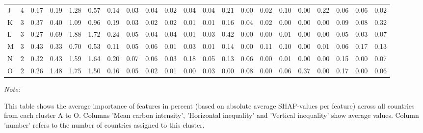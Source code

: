 \begin{table}[H]
{\begin{threeparttable}
\begin{tabular}[t]{lrrrrrrrrrrrrrrrrrrrr}
J & 4 & 0.17 & 0.19 & 1.28 & 0.57 & 0.14 & 0.03 & 0.04 & 0.02 & 0.04 & 0.04 & 0.21 & 0.00 & 0.02 & 0.10 & 0.00 & 0.22 & 0.06 & 0.06 & 0.02\\
K & 3 & 0.37 & 0.40 & 1.09 & 0.96 & 0.19 & 0.03 & 0.02 & 0.02 & 0.01 & 0.01 & 0.16 & 0.04 & 0.02 & 0.00 & 0.00 & 0.00 & 0.09 & 0.08 & 0.32\\
L & 3 & 0.27 & 0.69 & 1.88 & 1.72 & 0.24 & 0.05 & 0.04 & 0.04 & 0.01 & 0.03 & 0.42 & 0.00 & 0.00 & 0.01 & 0.00 & 0.00 & 0.05 & 0.03 & 0.07\\
M & 3 & 0.43 & 0.33 & 0.70 & 0.53 & 0.11 & 0.05 & 0.06 & 0.01 & 0.03 & 0.01 & 0.14 & 0.00 & 0.11 & 0.10 & 0.00 & 0.01 & 0.06 & 0.17 & 0.13\\
N & 2 & 0.32 & 0.43 & 1.59 & 1.64 & 0.20 & 0.07 & 0.06 & 0.03 & 0.18 & 0.05 & 0.13 & 0.06 & 0.00 & 0.01 & 0.00 & 0.00 & 0.15 & 0.00 & 0.07\\
O & 2 & 0.26 & 1.48 & 1.75 & 1.50 & 0.16 & 0.05 & 0.02 & 0.01 & 0.00 & 0.03 & 0.00 & 0.08 & 0.00 & 0.06 & 0.37 & 0.00 & 0.17 & 0.00 & 0.06\\
\bottomrule
\end{tabular}
\begin{tablenotes}
\item \textit{Note: } 
\item This table shows the average importance of features in percent (based on absolute average SHAP-values per feature) across all countries from each cluster A to O. Columns 'Mean carbon intensity', 'Horizontal inequality' and 'Vertical inequality' show average values. Column 'number' refers to the number of countries assigned to this cluster.
\end{tablenotes}
\end{threeparttable}}
\end{table}
